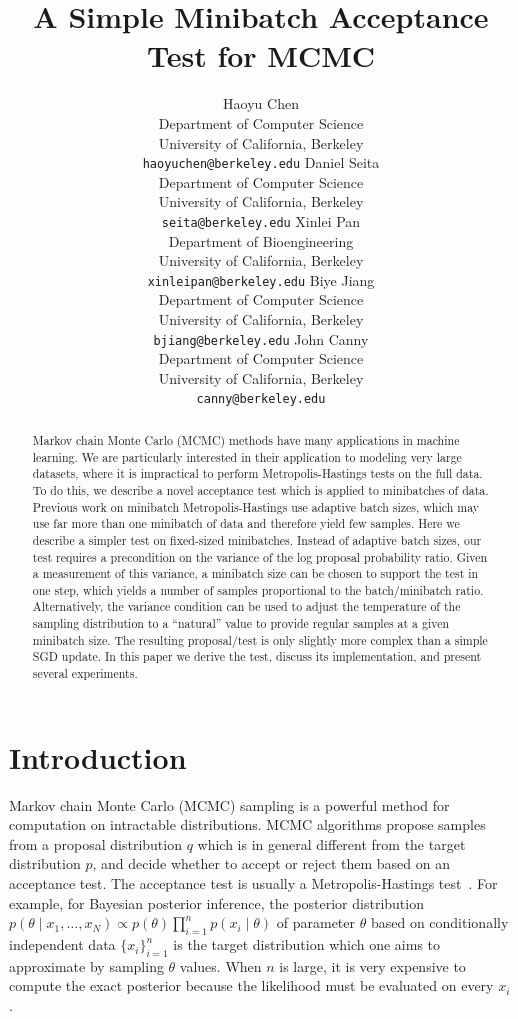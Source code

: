 \documentclass{article}
\title{A Simple Minibatch Acceptance Test for MCMC}
\author{
  Haoyu Chen \\
  Department of Computer Science \\
  University of California, Berkeley \\
  \texttt{haoyuchen@berkeley.edu}
  \And
  Daniel Seita \\
  Department of Computer Science \\
  University of California, Berkeley \\
  \texttt{seita@berkeley.edu}
  \And
  Xinlei Pan \\
  Department of Bioengineering \\
  University of California, Berkeley \\
  \texttt{xinleipan@berkeley.edu}
  \And 
  Biye Jiang \\
  Department of Computer Science \\
  University of California, Berkeley \\
  \texttt{bjiang@berkeley.edu}
  \And
  John Canny \\
  Department of Computer Science \\
  University of California, Berkeley \\
  \texttt{canny@berkeley.edu}
}
\begin{document}
\maketitle

\begin{abstract}
Markov chain Monte Carlo (MCMC) methods have many applications in
machine learning. We are particularly interested in their application
to modeling very large datasets, where it is impractical to
perform Metropolis-Hastings tests on the full data. To do this, we
describe a novel acceptance test which is applied to minibatches of
data. Previous work on minibatch Metropolis-Hastings use adaptive
batch sizes, which may use far more than one minibatch of data and therefore
yield few samples.  Here we describe a simpler test on fixed-sized
minibatches. Instead of adaptive batch sizes, our test requires a
precondition on the variance of the log proposal probability
ratio. Given a measurement of this variance, a minibatch size can be
chosen to support the test in one step, which yields a number of
samples proportional to the batch/minibatch ratio. Alternatively, the
variance condition can be used to adjust the temperature of the
sampling distribution to a ``natural'' value to provide regular
samples at a given minibatch size. The resulting proposal/test is only
slightly more complex than a simple SGD update. In this paper we
derive the test, discuss its implementation, and present several
experiments.
\end{abstract}



\section{Introduction}\label{sec:introduction}

Markov chain Monte Carlo (MCMC) sampling is a powerful method for
computation on intractable distributions. MCMC algorithms propose
samples from a proposal distribution $q$ which is in general different
from the target distribution $p$, and decide whether to accept or
reject them based on an acceptance test. The acceptance test is
usually a Metropolis-Hastings
test~\cite{Metropolis1953,hastings70}. For example, for Bayesian
posterior inference, the posterior distribution $p(\theta \mid x_1,
\ldots, x_N) \propto p(\theta)\prod_{i=1}^np(x_i \mid \theta)$ of
parameter $\theta$ based on conditionally independent data
$\{x_i\}_{i=1}^n$ is the target distribution which one aims to
approximate by sampling $\theta$ values. When $n$ is large, it is
very expensive to compute the exact posterior because the
likelihood must be evaluated on every $x_i$.
\end{document}
